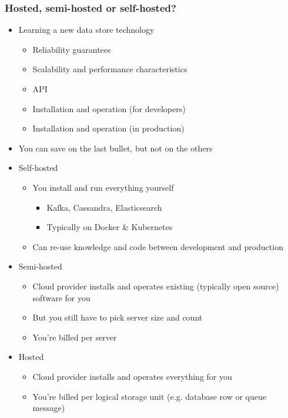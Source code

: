 \documentclass[8pt]{article}
\begin{document}
\subsubsection{Hosted, semi-hosted or self-hosted?}
\label{sec:org0119365}
\begin{itemize}
\item Learning a new data store technology
\begin{itemize}
\item Reliability guarantees
\item Scalability and performance characteristics
\item API
\item Installation and operation (for developers)
\item Installation and operation (in production)
\end{itemize}
\item You can save on the last bullet, but not on the others

\item Self-hosted
\begin{itemize}
\item You install and run everything yourself
\begin{itemize}
\item Kafka, Cassandra, Elasticsearch
\item Typically on Docker \& Kubernetes
\end{itemize}
\item Can re-use knowledge and code between development and production
\end{itemize}
\item Semi-hosted
\begin{itemize}
\item Cloud provider installs and operates existing (typically open source) software for you
\item But you still have to pick server size and count
\item You're billed per server
\end{itemize}
\item Hosted
\begin{itemize}
\item Cloud provider installs and operates everything for you
\item You're billed per logical storage unit (e.g. database row or queue message)
\end{itemize}
\end{itemize}
\end{document}
